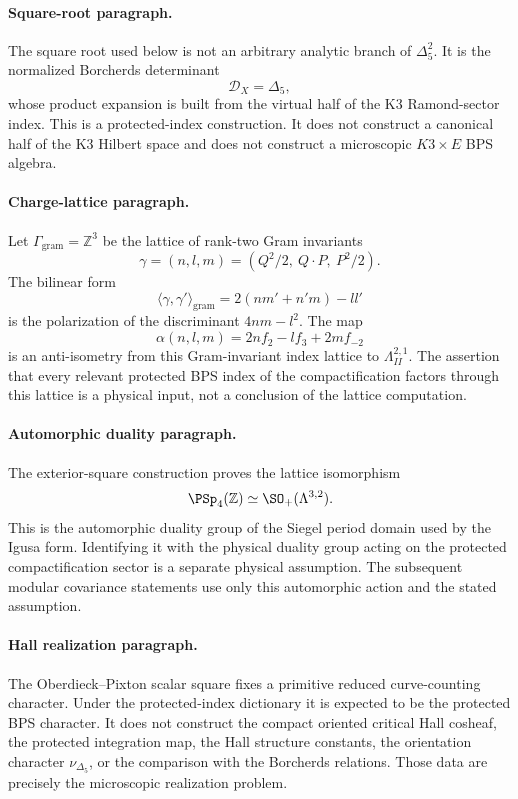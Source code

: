 \paragraph{Square-root paragraph.}
The square root used below is not an arbitrary analytic branch of
\(\Delta_5^2\).  It is the normalized Borcherds determinant
$$
\mathcal D_X=\Delta_5,
$$
whose product expansion is built from the virtual half of the K3
Ramond-sector index.  This is a protected-index construction.  It does
not construct a canonical half of the K3 Hilbert space and does not
construct a microscopic \(K3\times E\) BPS algebra.

\paragraph{Charge-lattice paragraph.}
Let \(\Gamma_{\mathrm{gram}}=\mathbb Z^3\) be the lattice of
rank-two Gram invariants
$$
\gamma=(n,l,m)=\left(Q^2/2,\ Q\cdot P,\ P^2/2\right).
$$
The bilinear form
$$
\langle\gamma,\gamma'\rangle_{\mathrm{gram}}
=2(nm'+n'm)-ll'
$$
is the polarization of the discriminant \(4nm-l^2\).  The map
$$
\alpha(n,l,m)=2nf_2-lf_3+2mf_{-2}
$$
is an anti-isometry from this Gram-invariant index lattice to
\(\Lambda^{2,1}_{II}\).  The assertion that every relevant protected
BPS index of the compactification factors through this lattice is a
physical input, not a conclusion of the lattice computation.

\paragraph{Automorphic duality paragraph.}
The exterior-square construction proves the lattice isomorphism
$$
\PSp_4(\mathbb Z)\simeq\SO_+(\Lambda^{3,2}).
$$
This is the automorphic duality group of the Siegel period domain used by
the Igusa form.  Identifying it with the physical duality group acting on
the protected compactification sector is a separate physical
assumption.  The subsequent modular covariance statements use only this
automorphic action and the stated assumption.

\paragraph{Hall realization paragraph.}
The Oberdieck--Pixton scalar square fixes a primitive reduced
curve-counting character.  Under the protected-index dictionary it is
expected to be the protected BPS character.  It does not construct the
compact oriented critical Hall cosheaf, the protected integration map,
the Hall structure constants, the orientation character
\(\nu_{\Delta_5}\), or the comparison with the Borcherds relations.
Those data are precisely the microscopic realization problem.

